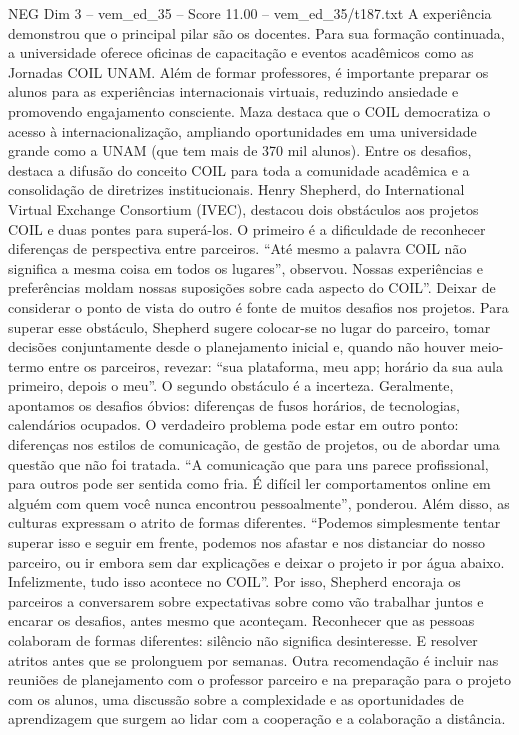 \begin{textsample}{NEG Dim 3 – vem\_ed\_35 – Score 11.00 – vem\_ed\_35/t187.txt}
A experiência demonstrou que o principal pilar são os docentes.
Para sua formação continuada, a universidade oferece oficinas de capacitação e eventos acadêmicos como as Jornadas COIL UNAM.
Além de formar professores, é importante preparar os alunos para as experiências internacionais virtuais, reduzindo ansiedade e promovendo engajamento consciente.
Maza destaca que o COIL democratiza o acesso à internacionalização, ampliando oportunidades em uma universidade grande como a UNAM (que tem mais de 370 mil alunos).
Entre os desafios, destaca a difusão do conceito COIL para toda a comunidade acadêmica e a consolidação de diretrizes institucionais.
Henry Shepherd, do International Virtual Exchange Consortium (IVEC), destacou dois obstáculos aos projetos COIL e duas pontes para superá-los.
O primeiro é a dificuldade de reconhecer diferenças de perspectiva entre parceiros. “Até mesmo a palavra COIL não significa a mesma coisa em todos os lugares”, observou.
Nossas experiências e preferências moldam nossas suposições sobre cada aspecto do COIL”.
Deixar de considerar o ponto de vista do outro é fonte de muitos desafios nos projetos.
Para superar esse obstáculo, Shepherd sugere colocar-se no lugar do parceiro, tomar decisões conjuntamente desde o planejamento inicial e, quando não houver meio-termo entre os parceiros, revezar: “sua plataforma, meu app; horário da sua aula primeiro, depois o meu”.
O segundo obstáculo é a incerteza.
Geralmente, apontamos os desafios óbvios: diferenças de fusos horários, de tecnologias, calendários ocupados.
O verdadeiro problema pode estar em outro ponto: diferenças nos estilos de comunicação, de gestão de projetos, ou de abordar uma questão que não foi tratada. “A comunicação que para uns parece profissional, para outros pode ser sentida como fria.
É difícil ler comportamentos online em alguém com quem você nunca encontrou pessoalmente”, ponderou.
Além disso, as culturas expressam o atrito de formas diferentes. “Podemos simplesmente tentar superar isso e seguir em frente, podemos nos afastar e nos distanciar do nosso parceiro, ou ir embora sem dar explicações e deixar o projeto ir por água abaixo.
Infelizmente, tudo isso acontece no COIL”.
Por isso, Shepherd encoraja os parceiros a conversarem sobre expectativas sobre como vão trabalhar juntos e encarar os desafios, antes mesmo que aconteçam.
Reconhecer que as pessoas colaboram de formas diferentes: silêncio não significa desinteresse.
E resolver atritos antes que se prolonguem por semanas.
Outra recomendação é incluir nas reuniões de planejamento com o professor parceiro e na preparação para o projeto com os alunos, uma discussão sobre a complexidade e as oportunidades de aprendizagem que surgem ao lidar com a cooperação e a colaboração a distância.

\end{textsample}
